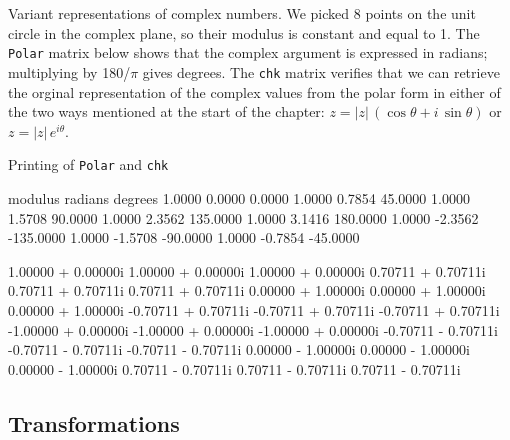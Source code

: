 \begin{script}[htbp]
  \caption{Variant representations of complex numbers. We picked 8
    points on the unit circle in the complex plane, so their modulus
    is constant and equal to 1. The \texttt{Polar} matrix below shows
    that the complex argument is expressed in radians; multiplying by
    180/$\pi$ gives degrees. The \texttt{chk} matrix verifies that
    we can retrieve the orginal representation of the complex values
    from the polar form in either of the two ways mentioned at the
    start of the chapter: $z = |z|\,(\cos \theta + i\,\sin \theta)$ or
    $z = |z|\,e^{i\theta}$.}
  \label{cmplx-modes}
  Printing of \texttt{Polar} and \texttt{chk}
\begin{scode}
     modulus     radians     degrees
      1.0000      0.0000      0.0000
      1.0000      0.7854     45.0000
      1.0000      1.5708     90.0000
      1.0000      2.3562    135.0000
      1.0000      3.1416    180.0000
      1.0000     -2.3562   -135.0000
      1.0000     -1.5708    -90.0000
      1.0000     -0.7854    -45.0000

 1.00000 + 0.00000i   1.00000 + 0.00000i   1.00000 + 0.00000i
 0.70711 + 0.70711i   0.70711 + 0.70711i   0.70711 + 0.70711i
 0.00000 + 1.00000i   0.00000 + 1.00000i   0.00000 + 1.00000i
-0.70711 + 0.70711i  -0.70711 + 0.70711i  -0.70711 + 0.70711i
-1.00000 + 0.00000i  -1.00000 + 0.00000i  -1.00000 + 0.00000i
-0.70711 - 0.70711i  -0.70711 - 0.70711i  -0.70711 - 0.70711i
 0.00000 - 1.00000i   0.00000 - 1.00000i   0.00000 - 1.00000i
 0.70711 - 0.70711i   0.70711 - 0.70711i   0.70711 - 0.70711i
\end{scode}
\end{script}

\subsection{Transformations}

